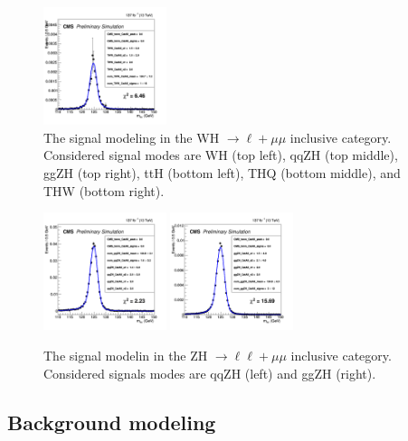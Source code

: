 \begin{figure}[!htb]
  \includegraphics[width=0.32\textwidth]{pics/VH_sec/WH_signal_models/THW_CatAll_fit_DSCB_1.png}
  \caption{The signal modeling in the WH $\to \ell+\mu\mu$ inclusive category. Considered signal modes are WH (top left), 
           qqZH (top middle), ggZH (top right), ttH (bottom left), THQ (bottom middle), and THW (bottom right).}
  \label{fig:signal_models_in_WH3l}
\end{figure}

\begin{figure}[!htb]
  \centering
  \captionsetup{justification=justified}
  \includegraphics[width=0.32\textwidth]{pics/VH_sec/ZH_signal_models/qqZH_CatAll_fit_DSCB_1.png}
  \includegraphics[width=0.32\textwidth]{pics/VH_sec/ZH_signal_models/ggZH_CatAll_fit_DSCB_1.png}
  \caption{The signal modelin in the ZH $\to \ell\ell+\mu\mu$ inclusive category. Considered signals modes are 
           qqZH (left) and ggZH (right).}
  \label{fig:ZH_signal_model_in_ZH4l}
\end{figure}


\subsection{Background modeling}\label{sec:vh_bkg_model}

